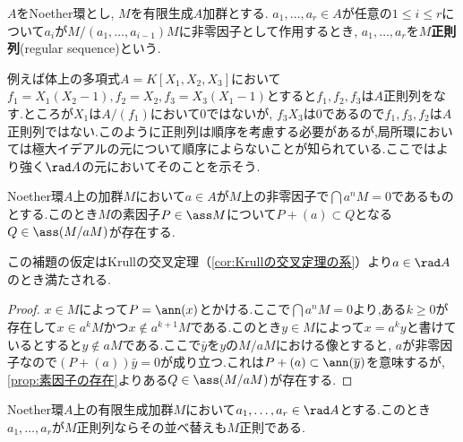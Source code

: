 \begin{defi}[正則列]
	$A$をNoether環とし, $M$を有限生成$A$加群とする. $a_1,\dots,a_r\in A$が任意の$1\leq i\leq r$について$a_i$が$M/(a_1,\dots,a_{i-1})M$に非零因子として作用するとき, $a_1,\dots,a_r$を$M$\textbf{正則列}(regular sequence)という.
\end{defi}

例えば体上の多項式$A=K[X_1,X_2,X_3]$において$f_1=X_1(X_2-1),f_2=X_2,f_3=X_3(X_1-1)$とすると$f_1,f_2,f_3$は$A$正則列をなす.ところが$X_1$は$A/(f_1)$において$0$ではないが, $f_3X_3$は$0$であるので$f_1,f_3,f_2$は$A$正則列ではない.このように正則列は順序を考慮する必要があるが,局所環においては極大イデアルの元について順序によらないことが知られている.ここではより強く$\rad A$の元においてそのことを示そう.

\begin{lem}
	Noether環$A$上の加群$M$において$a\in A$が$M$上の非零因子で$\bigcap a^nM=0$であるものとする.このとき$M$の素因子$P\in\ass M$について$P+(a)\subset Q$となる$Q\in\ass (M/aM)$が存在する.
\end{lem}

この補題の仮定はKrullの交叉定理（\ref{cor:Krullの交叉定理の系}）より$a\in\rad A$のとき満たされる.

\begin{proof}
	$x\in M$によって$P=\ann (x)$とかける.ここで$\bigcap a^nM=0$より,ある$k\geq0$が存在して$x\in a^kM$かつ$x\not\in a^{k+1}M$である.このとき$y\in M$によって$x=a^ky$と書けているとすると$y\not\in aM$である.ここで$\bar{y}$を$y$の$M/aM$における像とすると, $a$が非零因子なので$(P+(a))\bar{y}=0$が成り立つ.これは$P+(a)\subset\ann (\bar{y})$を意味するが,\ref{prop:素因子の存在}よりある$Q\in\ass (M/aM)$が存在する.
\end{proof}

\begin{prop}
	Noether環$A$上の有限生成加群$M$において$a_1,\dots,a_r\in\rad A$とする.このとき$a_1,\dots,a_r$が$M$正則列ならその並べ替えも$M$正則である.
\end{prop}

